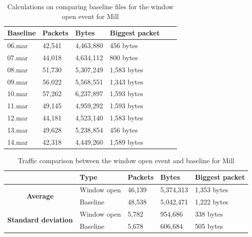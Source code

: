 \begin{table}[H]
    \centering
    \caption{Calculations on comparing baseline files for the window open event for Mill}
    \begin{tabular}{|l|l|l|l|l|l|}
    \hline
        \textbf{Baseline} & \textbf{Packets} & \textbf{Bytes} & \textbf{Biggest packet} \\ \hline
        06.mar & 42,541 & 4,463,880 & 456 bytes \\ \hline
        07.mar & 44,018 & 4,634,112 & 800 bytes \\ \hline
        08.mar & 51,730 & 5,307,249 & 1,583 bytes \\ \hline
        09.mar & 56,022 & 5,568,551 & 1,343 bytes \\ \hline
        10.mar & 57,262 & 6,237,897 & 1,593 bytes \\ \hline
        11.mar & 49,145 & 4,959,292 & 1,593 bytes \\ \hline
        12.mar & 44,181 & 4,523,140 & 1,583 bytes \\ \hline
        13.mar & 49,628 & 5,238,854 & 456 bytes \\ \hline
        14.mar & 42,318 & 4,449,260 & 1,589 bytes \\ \hline
    \end{tabular}
    \label{tab:MillBaselineWindowCalculations}
\end{table}

\begin{table}[H]
    \centering
    \caption{Traffic comparison between the window open event and baseline for Mill}
    \begin{tabular}{c|l|l|l|l|}
        \cline{2-5}
        \multicolumn{1}{l|}{}                                              & \textbf{Type} & \textbf{Packets} & \textbf{Bytes} & \textbf{Biggest packet} \\ \hline
        \multicolumn{1}{|c|}{\multirow{2}{*}{\textbf{Average}}}            & Window open         & 46,139           & 5,374,313      & 1,353 bytes             \\ \cline{2-5} 
        \multicolumn{1}{|c|}{}                                             & Baseline      & 48,538           & 5,042,471      & 1,222 bytes              \\ \hline
        \multicolumn{1}{|c|}{\multirow{2}{*}{\textbf{Standard deviation}}} & Window open         & 5,782            & 954,686        & 338 bytes              \\ \cline{2-5} 
        \multicolumn{1}{|c|}{}                                             & Baseline      & 5,678            & 606,684        & 505 bytes             \\ \hline          
    \end{tabular}
    \label{tab:MillComparingBaselineAndWindowCalculations}
\end{table}

